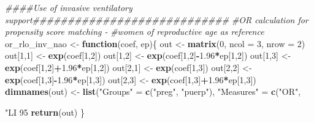 \documentclass[
]{article}
\newenvironment{Shaded}{\begin{snugshade}}{\end{snugshade}}
\newcommand{\CommentTok}[1]{\textcolor[rgb]{0.56,0.35,0.01}{\textit{#1}}}
\newcommand{\ControlFlowTok}[1]{\textcolor[rgb]{0.13,0.29,0.53}{\textbf{#1}}}
\newcommand{\DataTypeTok}[1]{\textcolor[rgb]{0.13,0.29,0.53}{#1}}
\newcommand{\DecValTok}[1]{\textcolor[rgb]{0.00,0.00,0.81}{#1}}
\newcommand{\FloatTok}[1]{\textcolor[rgb]{0.00,0.00,0.81}{#1}}
\newcommand{\KeywordTok}[1]{\textcolor[rgb]{0.13,0.29,0.53}{\textbf{#1}}}
\newcommand{\NormalTok}[1]{#1}
\newcommand{\OperatorTok}[1]{\textcolor[rgb]{0.81,0.36,0.00}{\textbf{#1}}}
\newcommand{\StringTok}[1]{\textcolor[rgb]{0.31,0.60,0.02}{#1}}
\begin{document}
\begin{Shaded}
\begin{Highlighting}[]
\CommentTok{####Use of invasive ventilatory support############################}
\CommentTok{#OR calculation for propensity score matching - }
\CommentTok{#women of reproductive age as reference}
\NormalTok{or_rlo_inv_nao <-}\StringTok{ }\ControlFlowTok{function}\NormalTok{(coef, ep)\{}
\NormalTok{  out <-}\StringTok{ }\KeywordTok{matrix}\NormalTok{(}\DecValTok{0}\NormalTok{, }\DataTypeTok{ncol =} \DecValTok{3}\NormalTok{, }\DataTypeTok{nrow =} \DecValTok{2}\NormalTok{)}
\NormalTok{  out[}\DecValTok{1}\NormalTok{,}\DecValTok{1}\NormalTok{] <-}\StringTok{ }\KeywordTok{exp}\NormalTok{(coef[}\DecValTok{1}\NormalTok{,}\DecValTok{2}\NormalTok{])}
\NormalTok{  out[}\DecValTok{1}\NormalTok{,}\DecValTok{2}\NormalTok{] <-}\StringTok{ }\KeywordTok{exp}\NormalTok{(coef[}\DecValTok{1}\NormalTok{,}\DecValTok{2}\NormalTok{]}\OperatorTok{-}\FloatTok{1.96}\OperatorTok{*}\NormalTok{ep[}\DecValTok{1}\NormalTok{,}\DecValTok{2}\NormalTok{])}
\NormalTok{  out[}\DecValTok{1}\NormalTok{,}\DecValTok{3}\NormalTok{] <-}\StringTok{ }\KeywordTok{exp}\NormalTok{(coef[}\DecValTok{1}\NormalTok{,}\DecValTok{2}\NormalTok{]}\OperatorTok{+}\FloatTok{1.96}\OperatorTok{*}\NormalTok{ep[}\DecValTok{1}\NormalTok{,}\DecValTok{2}\NormalTok{])  }
\NormalTok{  out[}\DecValTok{2}\NormalTok{,}\DecValTok{1}\NormalTok{] <-}\StringTok{ }\KeywordTok{exp}\NormalTok{(coef[}\DecValTok{1}\NormalTok{,}\DecValTok{3}\NormalTok{])}
\NormalTok{  out[}\DecValTok{2}\NormalTok{,}\DecValTok{2}\NormalTok{] <-}\StringTok{ }\KeywordTok{exp}\NormalTok{(coef[}\DecValTok{1}\NormalTok{,}\DecValTok{3}\NormalTok{]}\OperatorTok{-}\FloatTok{1.96}\OperatorTok{*}\NormalTok{ep[}\DecValTok{1}\NormalTok{,}\DecValTok{3}\NormalTok{])}
\NormalTok{  out[}\DecValTok{2}\NormalTok{,}\DecValTok{3}\NormalTok{] <-}\StringTok{ }\KeywordTok{exp}\NormalTok{(coef[}\DecValTok{1}\NormalTok{,}\DecValTok{3}\NormalTok{]}\OperatorTok{+}\FloatTok{1.96}\OperatorTok{*}\NormalTok{ep[}\DecValTok{1}\NormalTok{,}\DecValTok{3}\NormalTok{]) }
  \KeywordTok{dimnames}\NormalTok{(out) <-}\StringTok{ }\KeywordTok{list}\NormalTok{(}\StringTok{"Groups"}\NormalTok{ =}\StringTok{ }\KeywordTok{c}\NormalTok{(}\StringTok{"preg"}\NormalTok{, }\StringTok{"puerp"}\NormalTok{), }
                        \StringTok{"Measures"}\NormalTok{ =}\StringTok{ }\KeywordTok{c}\NormalTok{(}\StringTok{"OR"}\NormalTok{, }\StringTok{"LI 95%"}\NormalTok{, }\StringTok{"LS 95%"}\NormalTok{))}
  \KeywordTok{return}\NormalTok{(out)}
\NormalTok{\}}

}
\end{Highlighting}
\end{Shaded}
\end{document}
